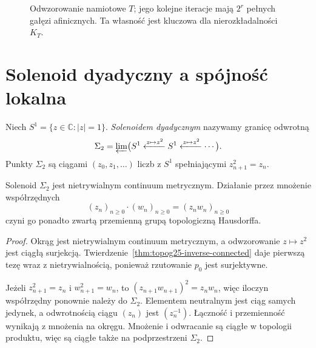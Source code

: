 \begin{figure}[htbp]
\centering
{}
\caption{Odwzorowanie namiotowe \(T\); jego kolejne
iteracje mają \(2^r\) pełnych gałęzi afinicznych.
Ta własność jest kluczowa dla nierozkładalności \(K_T\).}
\label{fig:topog25-tent}
\end{figure}

\section{Solenoid dyadyczny a spójność lokalna}
\label{sec:topog25-solenoid}

\begin{definicja}
\label{def:topog25-solenoid}
Niech \(S^1=\{z\in\mathbb C:|z|=1\}\).
\emph{Solenoidem dyadycznym} nazywamy
granicę odwrotną
\[
 \Sigma_2=\varprojlim
 \bigl(S^1\xleftarrow{z\mapsto z^2}S^1
 \xleftarrow{z\mapsto z^2}\cdots\bigr).
\]
Punkty \(\Sigma_2\) są ciągami
\((z_0,z_1,\ldots)\) liczb z \(S^1\)
spełniającymi \(z_{n+1}^2=z_n\).
\end{definicja}

\begin{stwierdzenie}
\label{prop:topog25-solenoid-continuum}
Solenoid \(\Sigma_2\) jest
nietrywialnym continuum metrycznym.
Działanie przez mnożenie współrzędnych
\[
 (z_n)_{n\ge0}\cdot(w_n)_{n\ge0}
 =(z_nw_n)_{n\ge0}
\]
czyni go ponadto zwartą
przemienną grupą topologiczną Hausdorffa.
\end{stwierdzenie}
\begin{proof}
Okrąg jest nietrywialnym
continuum metrycznym,
a odwzorowanie \(z\mapsto z^2\)
jest ciągłą surjekcją.
Twierdzenie~\ref{thm:topog25-inverse-connected}
daje pierwszą tezę wraz
z nietrywialnością, ponieważ
rzutowanie \(p_0\) jest surjektywne.

Jeżeli \(z_{n+1}^2=z_n\)
i \(w_{n+1}^2=w_n\),
to \((z_{n+1}w_{n+1})^2=z_nw_n\),
więc iloczyn współrzędny
ponownie należy do \(\Sigma_2\).
Elementem neutralnym jest
ciąg samych jedynek,
a odwrotnością ciągu \((z_n)\)
jest \((z_n^{-1})\).
Łączność i przemienność wynikają
z mnożenia na okręgu.
Mnożenie i odwracanie
są ciągłe w topologii produktu,
więc są ciągłe także
na podprzestrzeni \(\Sigma_2\).
\end{proof}


